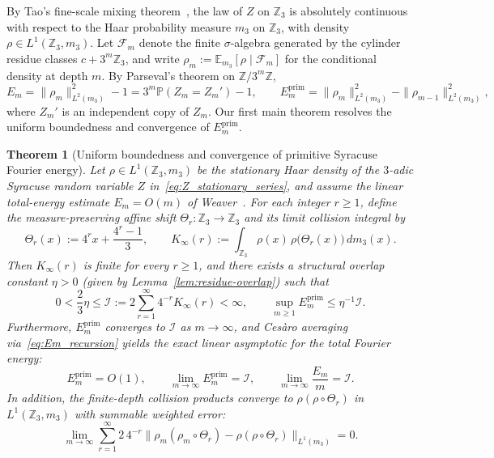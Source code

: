 \documentclass[11pt,a4paper]{article}
\numberwithin{equation}{section}
\newtheorem{theorem}{Theorem}[section]
\theoremstyle{definition}
\theoremstyle{remark}
\newcommand{\Z}{\mathbb{Z}}
\newcommand{\E}{\mathbb{E}}
\renewcommand{\P}{\mathbb{P}}
\newcommand{\cF}{\mathcal{F}}
\newcommand{\cI}{\mathcal{I}}
\newcommand{\prim}{\mathrm{prim}}
\begin{document}
By Tao's fine-scale mixing theorem~\cite[Proposition~1.14]{Tao2019}, the law of $Z$ on $\Z_3$ is absolutely continuous with respect to the Haar probability measure $m_3$ on $\Z_3$, with density $\rho \in L^1(\Z_3, m_3)$. Let $\cF_m$ denote the finite $\sigma$-algebra generated by the cylinder residue classes $c + 3^m\Z_3$, and write $\rho_m := \E_{m_3}[\rho \mid \cF_m]$ for the conditional density at depth $m$. By Parseval's theorem on $\Z/3^m\Z$,
\begin{equation}\label{eq:parseval_Em}
E_m = \|\rho_m\|_{L^2(m_3)}^2 - 1 = 3^m \P(Z_m = Z_m') - 1, \qquad E_m^{\prim} = \|\rho_m\|_{L^2(m_3)}^2 - \|\rho_{m-1}\|_{L^2(m_3)}^2,
\end{equation}
where $Z_m'$ is an independent copy of $Z_m$. Our first main theorem resolves the uniform boundedness and convergence of $E_m^{\prim}$.

\begin{theorem}[Uniform boundedness and convergence of primitive Syracuse Fourier energy]\label{thm:primitive-energy}
Let $\rho \in L^1(\Z_3, m_3)$ be the stationary Haar density of the $3$-adic Syracuse random variable $Z$ in~\eqref{eq:Z_stationary_series}, and assume the linear total-energy estimate $E_m = O(m)$ of Weaver~\cite[\S 7]{Weaver2026}. For each integer $r \ge 1$, define the measure-preserving affine shift $\Theta_r : \Z_3 \to \Z_3$ and its limit collision integral by
\begin{equation}\label{eq:Theta_r_def}
\Theta_r(x) := 4^r x + \frac{4^r - 1}{3}, \qquad K_\infty(r) := \int_{\Z_3} \rho(x)\,\rho\bigl(\Theta_r(x)\bigr)\,dm_3(x).
\end{equation}
Then $K_\infty(r)$ is finite for every $r \ge 1$, and there exists a structural overlap constant $\eta > 0$ (given by Lemma~\ref{lem:residue-overlap}) such that
\begin{equation}\label{eq:I_bounds}
0 < \frac{2}{3}\eta \le \cI := 2\sum_{r=1}^\infty 4^{-r} K_\infty(r) < \infty, \qquad \sup_{m \ge 1} E_m^{\prim} \le \eta^{-1}\cI.
\end{equation}
Furthermore, $E_m^{\prim}$ converges to $\cI$ as $m \to \infty$, and Ces\`aro averaging via~\eqref{eq:Em_recursion} yields the exact linear asymptotic for the total Fourier energy:
\begin{equation}\label{eq:primitive-energy-limit}
 \boxed{E_m^{\prim} = O(1), \qquad \lim_{m \to \infty} E_m^{\prim} = \cI, \qquad \lim_{m \to \infty} \frac{E_m}{m} = \cI.}
\end{equation}
In addition, the finite-depth collision products converge to $\rho(\rho\circ\Theta_r)$ in $L^1(\Z_3, m_3)$ with summable weighted error:
\begin{equation}\label{eq:weighted-collision-convergence}
 \lim_{m \to \infty} \sum_{r=1}^\infty 2\,4^{-r} \bigl\|\rho_m(\rho_m \circ \Theta_r) - \rho(\rho \circ \Theta_r)\bigr\|_{L^1(m_3)} = 0.
\end{equation}
\end{theorem}
\end{document}
